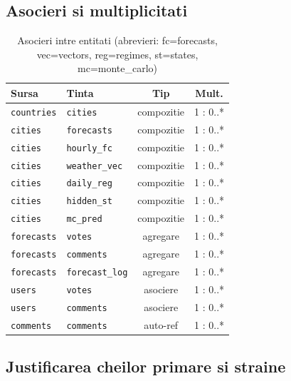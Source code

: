\documentclass[12pt,a4paper]{article}
\begin{document}
\subsection{Asocieri si multiplicitati}

\begin{table}[H]
\centering\small\setlength{\tabcolsep}{5pt}
\begin{tabular}{@{}llcc@{}}
\toprule
\textbf{Sursa} & \textbf{Tinta} & \textbf{Tip} & \textbf{Mult.} \\
\midrule
\texttt{countries} & \texttt{cities} & compozitie & 1 : 0..* \\
\texttt{cities} & \texttt{forecasts} & compozitie & 1 : 0..* \\
\texttt{cities} & \texttt{hourly\_fc} & compozitie & 1 : 0..* \\
\texttt{cities} & \texttt{weather\_vec} & compozitie & 1 : 0..* \\
\texttt{cities} & \texttt{daily\_reg} & compozitie & 1 : 0..* \\
\texttt{cities} & \texttt{hidden\_st} & compozitie & 1 : 0..* \\
\texttt{cities} & \texttt{mc\_pred} & compozitie & 1 : 0..* \\
\texttt{forecasts} & \texttt{votes} & agregare & 1 : 0..* \\
\texttt{forecasts} & \texttt{comments} & agregare & 1 : 0..* \\
\texttt{forecasts} & \texttt{forecast\_log} & agregare & 1 : 0..* \\
\texttt{users} & \texttt{votes} & asociere & 1 : 0..* \\
\texttt{users} & \texttt{comments} & asociere & 1 : 0..* \\
\texttt{comments} & \texttt{comments} & auto-ref & 1 : 0..* \\
\bottomrule
\end{tabular}
\caption{Asocieri intre entitati (abrevieri: fc=forecasts, vec=vectors, reg=regimes, st=states, mc=monte\_carlo)}
\end{table}

\subsection{Justificarea cheilor primare si straine}
\end{document}
